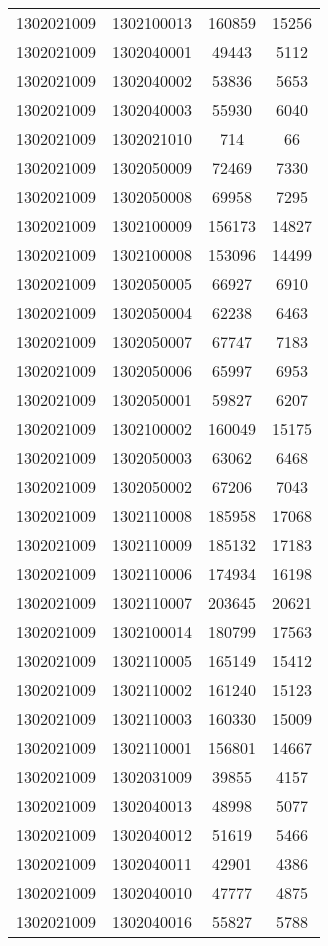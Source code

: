 \begin{longtable}[h]{llcc}
		1302021009 & 1302100013 & 160859 & 15256\\
		1302021009 & 1302040001 & 49443 & 5112\\
		1302021009 & 1302040002 & 53836 & 5653\\
		1302021009 & 1302040003 & 55930 & 6040\\
		1302021009 & 1302021010 & 714 & 66\\
		1302021009 & 1302050009 & 72469 & 7330\\
		1302021009 & 1302050008 & 69958 & 7295\\
		1302021009 & 1302100009 & 156173 & 14827\\
		1302021009 & 1302100008 & 153096 & 14499\\
		1302021009 & 1302050005 & 66927 & 6910\\
		1302021009 & 1302050004 & 62238 & 6463\\
		1302021009 & 1302050007 & 67747 & 7183\\
		1302021009 & 1302050006 & 65997 & 6953\\
		1302021009 & 1302050001 & 59827 & 6207\\
		1302021009 & 1302100002 & 160049 & 15175\\
		1302021009 & 1302050003 & 63062 & 6468\\
		1302021009 & 1302050002 & 67206 & 7043\\
		1302021009 & 1302110008 & 185958 & 17068\\
		1302021009 & 1302110009 & 185132 & 17183\\
		1302021009 & 1302110006 & 174934 & 16198\\
		1302021009 & 1302110007 & 203645 & 20621\\
		1302021009 & 1302100014 & 180799 & 17563\\
		1302021009 & 1302110005 & 165149 & 15412\\
		1302021009 & 1302110002 & 161240 & 15123\\
		1302021009 & 1302110003 & 160330 & 15009\\
		1302021009 & 1302110001 & 156801 & 14667\\
		1302021009 & 1302031009 & 39855 & 4157\\
		1302021009 & 1302040013 & 48998 & 5077\\
		1302021009 & 1302040012 & 51619 & 5466\\
		1302021009 & 1302040011 & 42901 & 4386\\
		1302021009 & 1302040010 & 47777 & 4875\\
		1302021009 & 1302040016 & 55827 & 5788\\

\end{longtable}
